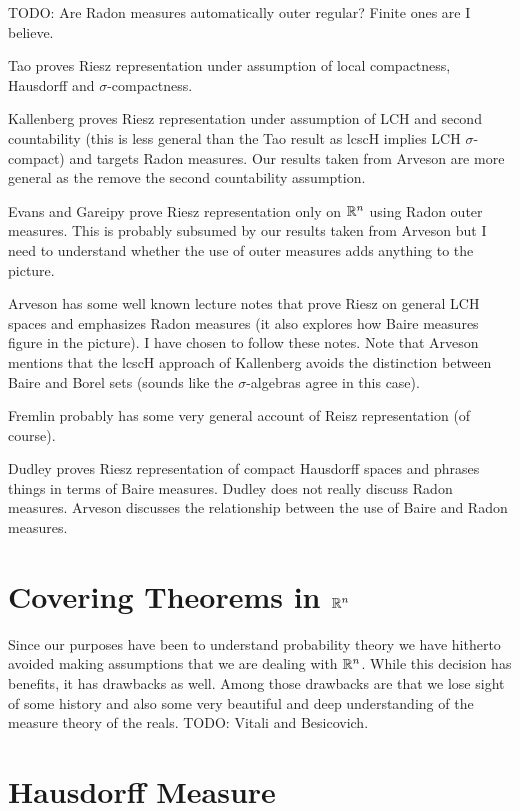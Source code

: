 TODO: Are Radon measures automatically outer regular?  Finite ones are
I believe.

Tao proves Riesz representation under assumption of local compactness, Hausdorff
and $\sigma$-compactness.

Kallenberg proves Riesz representation under assumption of LCH and
second countability (this is less general than the Tao
result as lcscH implies LCH $\sigma$-compact)
and targets Radon measures.  Our results taken from Arveson are more
general as the remove the second countability assumption.

Evans and Gareipy prove Riesz representation only on $\mathbb{R}^n$ using
Radon outer measures.  This is probably subsumed by our results taken
from Arveson but I need to understand whether the use of outer
measures adds anything to the picture.

Arveson has some well known lecture notes that prove Riesz on general
LCH spaces
and emphasizes Radon measures (it also explores how Baire measures figure in the
picture).  I have chosen to follow these notes.  Note that Arveson
mentions that the lcscH approach of Kallenberg avoids the distinction
between Baire and Borel sets (sounds like the $\sigma$-algebras agree
in this case).

Fremlin probably has some very general account of Reisz representation
(of course).

Dudley proves Riesz representation of compact Hausdorff spaces and
phrases things in terms of Baire measures.  Dudley does not really
discuss Radon measures.  Arveson discusses the relationship between
the use of Baire and Radon measures.

\section{Covering Theorems in $\mathbb{R}^n$}

Since our purposes have been to understand probability theory we have
hitherto avoided making assumptions that we are dealing with
$\mathbb{R}^n$.  While this decision has benefits, it has drawbacks as
well.  Among those drawbacks are that we lose sight of some history and also some very
beautiful and deep understanding of the measure theory of the reals.
TODO: Vitali and Besicovich.

\section{Hausdorff Measure}

